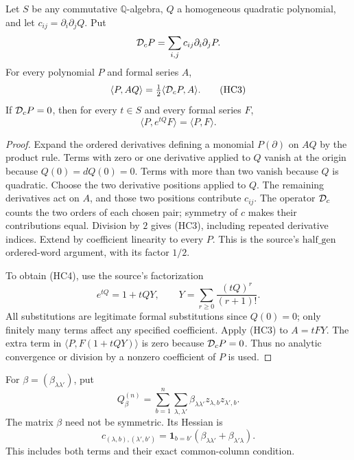 \begin{srlemma}
\label{lem:sr-source-quadratic-product-rule-cancellation}
Let \(S\) be any commutative \(\mathbb Q\)-algebra,
\(Q\) a homogeneous quadratic polynomial, and let
\(c_{ij}=\partial_i\partial_jQ\).
Put
\[
                   {\cal D}_cP=\sum_{i,j}c_{ij}
                                          \partial_i\partial_jP.
\]
For every polynomial \(P\) and formal series \(A\),
\[
                  \langle P,AQ\rangle
                         =\tfrac12\langle{\cal D}_cP,A\rangle .
 \tag{HC3}
\]
If \({\cal D}_cP=0\), then for every \(t\in S\)
and every formal series \(F\),
\[
                         \langle P,e^{tQ}F\rangle
                                      =\langle P,F\rangle. \tag{HC4}
\]
\end{srlemma}
\begin{proof}
Expand the ordered derivatives defining a monomial
\(P(\partial)\) on \(AQ\) by the product rule.
Terms with zero or one derivative applied to \(Q\)
vanish at the origin because \(Q(0)=dQ(0)=0\).
Terms with more than two vanish because \(Q\) is
quadratic.
Choose the two derivative positions applied to \(Q\).
The remaining derivatives act on \(A\), and those two
positions contribute \(c_{ij}\).
The operator \({\cal D}_c\) counts the two orders of
each chosen pair; symmetry of \(c\) makes their
contributions equal.
Division by \(2\) gives (HC3), including repeated
derivative indices.
Extend by coefficient linearity to every \(P\).
This is the source's \(\mathrm{half\_gen}\) ordered-word
argument, with its factor \(1/2\).

To obtain (HC4), use the source's factorization
\[
 e^{tQ}=1+tQY,\qquad
                  Y=\sum_{r\ge0}\frac{(tQ)^r}{(r+1)!}.
 \tag{HC5}
\]
All substitutions are legitimate formal substitutions
since \(Q(0)=0\); only finitely many terms affect any
specified coefficient.
Apply (HC3) to \(A=tFY\).
The extra term in \(\langle P,F(1+tQY)\rangle\)
is zero because \({\cal D}_cP=0\).
Thus no analytic convergence or division by a
nonzero coefficient of \(P\) is used.
\end{proof}

For \(\beta=(\beta_{\lambda\lambda'})\), put
\[
 Q_\beta^{(n)}
       =\sum_{b=1}^n\sum_{\lambda,\lambda'}
                     \beta_{\lambda\lambda'}
                                    z_{\lambda,b}z_{\lambda',b}.
 \tag{HC6}
\]
The matrix \(\beta\) need not be symmetric.
Its Hessian is
\[
 c_{(\lambda,b),(\lambda',b')}
  =\mathbf1_{b=b'}(\beta_{\lambda\lambda'}
                                      +\beta_{\lambda'\lambda}).
 \tag{HC7}
\]
This includes both terms and their exact common-column
condition.

